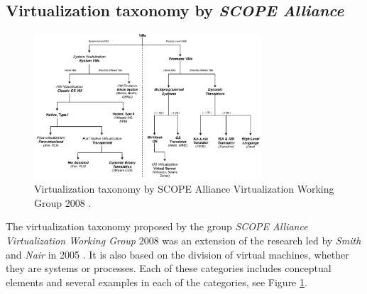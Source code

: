 	\subsection{Virtualization taxonomy by \textit{SCOPE Alliance}}
	
	\begin{figure}[H]
		\centering
		\includegraphics[width=8.5cm]{images/ScopeAlliance2008.pdf}
		\vspace{-0.2cm}
		\caption{Virtualization taxonomy by SCOPE Alliance Virtualization Working Group 2008 \cite{SCOPEAlliance2008}.}
		\label{fig:TaxonomyVirtualizationSCOPEAlliance2008}
	\end{figure}
	
	The virtualization taxonomy proposed by the group \textit{SCOPE Alliance Virtualization Working Group} 2008 \cite{SCOPEAlliance2008} was an extension of the research led by \textit{Smith} and \textit{Nair} in 2005 \cite{Smith2005}. It is also based on the division of virtual machines, whether they are systems or processes. Each of these categories includes conceptual elements and several examples in each of the categories, see Figure \ref{fig:TaxonomyVirtualizationSCOPEAlliance2008}. 
	
	
	
